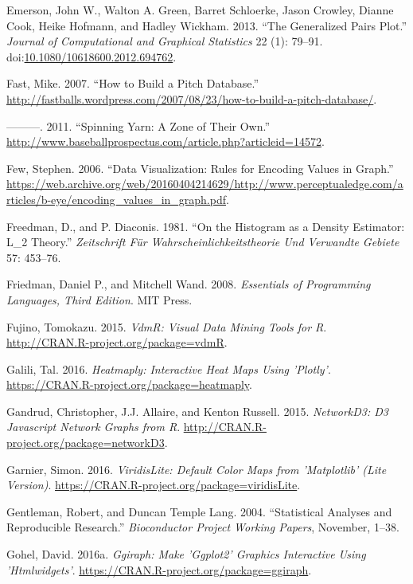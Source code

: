 \documentclass[12pt,]{isuthesis}
\begin{document}
\hypertarget{ref-gpp}{}
Emerson, John W., Walton A. Green, Barret Schloerke, Jason Crowley,
Dianne Cook, Heike Hofmann, and Hadley Wickham. 2013. ``The Generalized
Pairs Plot.'' \emph{Journal of Computational and Graphical Statistics}
22 (1): 79--91.
doi:\href{https://doi.org/10.1080/10618600.2012.694762}{10.1080/10618600.2012.694762}.

\hypertarget{ref-database}{}
Fast, Mike. 2007. ``How to Build a Pitch Database.''
\url{http://fastballs.wordpress.com/2007/08/23/how-to-build-a-pitch-database/}.

\hypertarget{ref-Strikezones}{}
---------. 2011. ``Spinning Yarn: A Zone of Their Own.''
\url{http://www.baseballprospectus.com/article.php?articleid=14572}.

\hypertarget{ref-few-values}{}
Few, Stephen. 2006. ``Data Visualization: Rules for Encoding Values in
Graph.''
\url{https://web.archive.org/web/20160404214629/http://www.perceptualedge.com/articles/b-eye/encoding_values_in_graph.pdf}.

\hypertarget{ref-FD}{}
Freedman, D., and P. Diaconis. 1981. ``On the Histogram as a Density
Estimator: L\_2 Theory.'' \emph{Zeitschrift Für
Wahrscheinlichkeitstheorie Und Verwandte Gebiete} 57: 453--76.

\hypertarget{ref-eopl}{}
Friedman, Daniel P., and Mitchell Wand. 2008. \emph{Essentials of
Programming Languages, Third Edition}. MIT Press.

\hypertarget{ref-vdmR}{}
Fujino, Tomokazu. 2015. \emph{VdmR: Visual Data Mining Tools for R}.
\url{http://CRAN.R-project.org/package=vdmR}.

\hypertarget{ref-heatmaply}{}
Galili, Tal. 2016. \emph{Heatmaply: Interactive Heat Maps Using
'Plotly'}. \url{https://CRAN.R-project.org/package=heatmaply}.

\hypertarget{ref-networkD3}{}
Gandrud, Christopher, J.J. Allaire, and Kenton Russell. 2015.
\emph{NetworkD3: D3 Javascript Network Graphs from R}.
\url{http://CRAN.R-project.org/package=networkD3}.

\hypertarget{ref-viridisLite}{}
Garnier, Simon. 2016. \emph{ViridisLite: Default Color Maps from
'Matplotlib' (Lite Version)}.
\url{https://CRAN.R-project.org/package=viridisLite}.

\hypertarget{ref-Gentleman:Lang}{}
Gentleman, Robert, and Duncan Temple Lang. 2004. ``Statistical Analyses
and Reproducible Research.'' \emph{Bioconductor Project Working Papers},
November, 1--38.

\hypertarget{ref-ggiraph}{}
Gohel, David. 2016a. \emph{Ggiraph: Make 'Ggplot2' Graphics Interactive
Using 'Htmlwidgets'}. \url{https://CRAN.R-project.org/package=ggiraph}.
\end{document}
